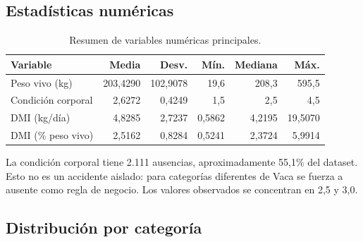 \documentclass[11pt,a4paper]{article}
\begin{document}
\subsection{Estadísticas numéricas}

\begin{table}[H]
\centering
\caption{Resumen de variables numéricas principales.}
\begin{tabular}{lrrrrr}
\toprule
\textbf{Variable} & \textbf{Media} & \textbf{Desv.} & \textbf{Mín.} & \textbf{Mediana} & \textbf{Máx.}\\
\midrule
Peso vivo (kg) & 203,4290 & 102,9078 & 19,6 & 208,3 & 595,5\\
Condición corporal & 2,6272 & 0,4249 & 1,5 & 2,5 & 4,5\\
DMI (kg/día) & 4,8285 & 2,7237 & 0,5862 & 4,2195 & 19,5070\\
DMI (\% peso vivo) & 2,5162 & 0,8284 & 0,5241 & 2,3724 & 5,9914\\
\bottomrule
\end{tabular}
\end{table}

La condición corporal tiene 2.111 ausencias, aproximadamente 55,1\% del dataset. Esto no es un accidente aislado: para categorías diferentes de Vaca se fuerza a ausente como regla de negocio. Los valores observados se concentran en 2,5 y 3,0.

\subsection{Distribución por categoría}

\begin{table}[H]
\centering
\caption{Composición y consumo por categoría.}
\end{table}
\end{document}
